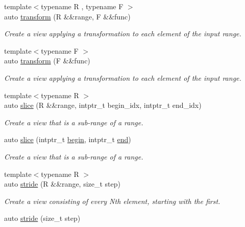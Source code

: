 \begin{DoxyCompactItemize}
{\footnotesize template$<$typename R , typename F $>$ }\\auto \mbox{\hyperlink{namespacerah_1_1view_a73d98aff6def51242231b9ec440dd026}{transform}} (R \&\&range, F \&\&func)
\begin{DoxyCompactList}\small\item\em Create a view applying a transformation to each element of the input range. \end{DoxyCompactList}\item 
{\footnotesize template$<$typename F $>$ }\\auto \mbox{\hyperlink{namespacerah_1_1view_a814771afc1cfedc6418915550bcd5bbd}{transform}} (F \&\&func)
\begin{DoxyCompactList}\small\item\em Create a view applying a transformation to each element of the input range. \end{DoxyCompactList}\item 
{\footnotesize template$<$typename R $>$ }\\auto \mbox{\hyperlink{namespacerah_1_1view_a26e48a024bda08769061de4ad6addd9c}{slice}} (R \&\&range, intptr\+\_\+t begin\+\_\+idx, intptr\+\_\+t end\+\_\+idx)
\begin{DoxyCompactList}\small\item\em Create a view that is a sub-\/range of a range. \end{DoxyCompactList}\item 
auto \mbox{\hyperlink{namespacerah_1_1view_a68942bf66ff2c838d6ed12008bc275c5}{slice}} (intptr\+\_\+t \mbox{\hyperlink{namespacerah_a2c4a19e57cc4e0753e93830f247def6d}{begin}}, intptr\+\_\+t \mbox{\hyperlink{namespacerah_aaddd1442cd76b96876e692cdefe7261d}{end}})
\begin{DoxyCompactList}\small\item\em Create a view that is a sub-\/range of a range. \end{DoxyCompactList}\item 
{\footnotesize template$<$typename R $>$ }\\auto \mbox{\hyperlink{namespacerah_1_1view_ad71e78df55f6f9416e2869a8c14f6779}{stride}} (R \&\&range, size\+\_\+t step)
\begin{DoxyCompactList}\small\item\em Create a view consisting of every Nth element, starting with the first. \end{DoxyCompactList}\item 
auto \mbox{\hyperlink{namespacerah_1_1view_abed0df62d7146e5d0905725efab0e40e}{stride}} (size\+\_\+t step)

\end{DoxyCompactItemize}
